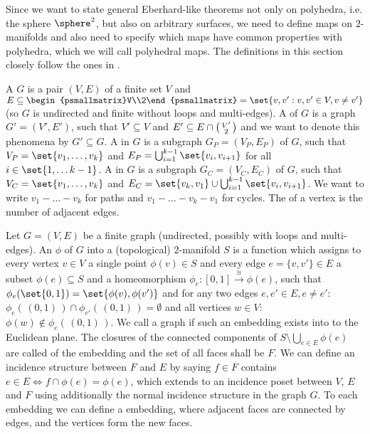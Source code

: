 \label{sec:polymap}

Since we want to state general {\sc Eberhard}-like theorems not only on polyhedra, i.e. the sphere $\sphere^2$, but also on arbitrary surfaces, we need to define maps on $2$-manifolds and also need to specify which maps have common properties with polyhedra, which we will call polyhedral maps. The definitions in this section closely follow the ones in \cite{brehm2004polyhedralmaps}.
\clearpage
\begin{definition}
  A  $G$ is a pair $(V, E)$ of a finite set $V$ and $E \subseteq \begin{psmallmatrix}V\\2\end{psmallmatrix} = \set{{v, v'} : v, v' \in V, v \neq v'}$ (so $G$ is undirected and finite without loops and multi-edges). A  of $G$ is a graph $G' = (V', E')$, such that $V' \subseteq V$ and $E' \subseteq E \cap  \begin{psmallmatrix}V'\\2\end{psmallmatrix}$ and we want to denote this phenomena by $G' \subseteq G$. A  in $G$ is a subgraph $G_P = (V_P, E_P)$ of $G$, such that $V_P = \set{v_1, \dots, v_k}$ and $E_P = \bigcup_{i = 1}^{k-1}\set{v_i, v_{i+1}}$ for all $i \in \set{1, \dots k - 1}$. A  in $G$ is a subgraph $G_C = (V_C, E_C)$ of $G$, such that $V_C = \set{v_1, \dots, v_k}$ and $E_C = \set{v_k, v_1} \cup \bigcup_{i = 1}^{k-1}\set{v_i, v_{i+1}}$. We want to write $v_1 - \dots - v_k$ for paths and $v_1 - \dots - v_k - v_1$ for cycles. The  of a vertex is the number of adjacent edges.
\end{definition}

\begin{definition}  Let $G = (V, E)$ be a finite graph (undirected, possibly with loops and multi-edges). An  $\phi$ of $G$ into a (topological) $2$-manifold $S$ is a function which assigns to every vertex $v \in V$ a single point $\phi(v) \in S$ and every edge $e = \{v, v'\} \in E$ a subset $\phi(e) \subseteq S$ and a homeomorphism $\phi_e : [0, 1] \stackrel{\cong}{\longrightarrow} \phi(e)$, such that $\phi_e(\set{0, 1}) = \set{\phi(v), \phi(v')}$ and for any two edges $e, e' \in E, e \neq e'$: $\phi_e(\,(0,1)\,) \cap \phi_{e'}(\,(0,1)\,) = \emptyset$ and all vertices $w \in V$: $\phi(w) \not\in \phi_e(\,(0,1)\,)$. We call a graph  if such an embedding exists into to the Euclidean plane. The closures of the connected components of $S \setminus \bigcup_{e \in E} \phi(e)$ are called  of the embedding and the set of all faces shall be $F$. We can define an incidence structure between $F$ and $E$ by saying $f \in F$ contains $e \in E \iff f \cap \phi(e) = \phi(e)$, which extends to an incidence poset between $V$, $E$ and $F$ using additionally the normal incidence structure in the graph $G$. To each embedding we can define a  embedding, where adjacent faces are connected by edges, and the vertices form the new faces.
\end{definition}

